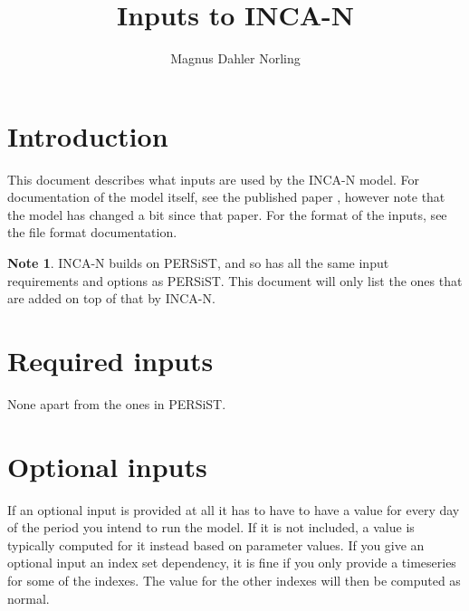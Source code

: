 \documentclass[11pt]{article}
\title{Inputs to INCA-N}
\author{Magnus Dahler Norling}
\theoremstyle{definition}
\newtheorem{mynote}{Note}
\newenvironment{note}%
  {\begin{lrbox}{\notebox}%
   \begin{minipage}{\dimexpr\linewidth-2\fboxsep}
   \begin{mynote}}%
  {\end{mynote}%
   \end{minipage}%
   \end{lrbox}%
   \begin{trivlist}
     \item[]\colorbox{silver}{\usebox\notebox}
   \end{trivlist}}
\begin{document}
\maketitle


\section{Introduction}

This document describes what inputs are used by the INCA-N model. For documentation of the model itself, see the published paper \cite{wade02}, however note that the model has changed a bit since that paper. For the format of the inputs, see the file format documentation.

\begin{note}
INCA-N builds on PERSiST, and so has all the same input requirements and options as PERSiST. This document will only list the ones that are added on top of that by INCA-N.
\end{note}

\section{Required inputs}

None apart from the ones in PERSiST.

\section{Optional inputs}

If an optional input is provided at all it has to have to have a value for every day of the period you intend to run the model. If it is not included, a value is typically computed for it instead based on parameter values. If you give an optional input an index set dependency, it is fine if you only provide a timeseries for some of the indexes. The value for the other indexes will then be computed as normal.
\end{document}
